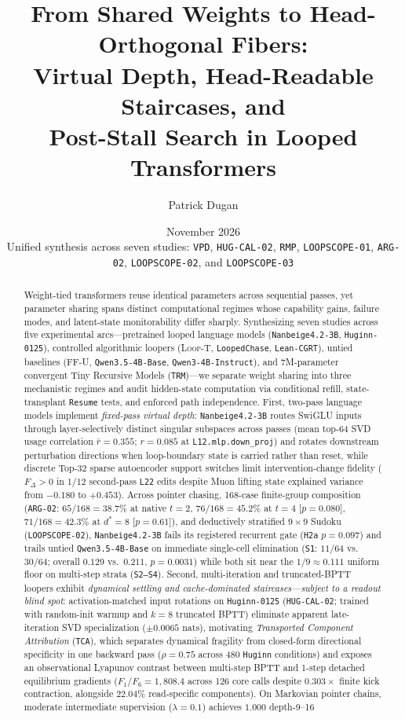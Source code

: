 \documentclass[10pt,letterpaper]{article}
\title{\bfseries From Shared Weights to Head-Orthogonal Fibers:\\[0.30em]
Virtual Depth, Head-Readable Staircases, and\\[0.14em]
Post-Stall Search in Looped Transformers}
\author{Patrick Dugan}
\date{November 2026\\[0.2em]\normalsize Unified synthesis across seven studies: \texttt{VPD}, \texttt{HUG-CAL-02}, \texttt{RMP}, \texttt{LOOPSCOPE-01}, \texttt{ARG-02}, \texttt{LOOPSCOPE-02}, and \texttt{LOOPSCOPE-03}}
\newcommand{\LoopT}{\textsc{Loop-T}}
\newcommand{\FFU}{\textsc{FF-U}}
\begin{document}
\maketitle
\vspace{-0.70em}

\begin{abstract}
\noindent
Weight-tied transformers reuse identical parameters across sequential passes, yet parameter sharing spans distinct computational regimes whose capability gains, failure modes, and latent-state monitorability differ sharply. Synthesizing seven studies across five experimental arcs—pretrained looped language models (\texttt{Nanbeige4.2-3B}, \texttt{Huginn-0125}), controlled algorithmic loopers (\LoopT, \texttt{LoopedChase}, \texttt{Lean-CGRT}), untied baselines (\FFU, \texttt{Qwen3.5-4B-Base}, \texttt{Qwen3-4B-Instruct}), and 7M-parameter convergent Tiny Recursive Models (\texttt{TRM})—we separate weight sharing into three mechanistic regimes and audit hidden-state computation via conditional refill, state-transplant \texttt{Resume} tests, and enforced path independence. First, two-pass language models implement \emph{fixed-pass virtual depth}: \texttt{Nanbeige4.2-3B} routes SwiGLU inputs through layer-selectively distinct singular subspaces across passes (mean top-64 SVD usage correlation $\bar{r}=0.355$; $r=0.085$ at \texttt{L12.mlp.down\_proj}) and rotates downstream perturbation directions when loop-boundary state is carried rather than reset, while discrete Top-32 sparse autoencoder support switches limit intervention-change fidelity ($F_\Delta > 0$ in $1/12$ second-pass \texttt{L22} edits despite Muon lifting state explained variance from $-0.180$ to $+0.453$). Across pointer chasing, 168-case finite-group composition (\texttt{ARG-02}: $65/168 = 38.7\%$ at native $t=2$, $76/168 = 45.2\%$ at $t=4$ [$p=0.080$], $71/168 = 42.3\%$ at $d^*=8$ [$p=0.61$]), and deductively stratified $9\times 9$ Sudoku (\texttt{LOOPSCOPE-02}), \texttt{Nanbeige4.2-3B} fails its registered recurrent gate (\texttt{H2a} $p=0.097$) and trails untied \texttt{Qwen3.5-4B-Base} on immediate single-cell elimination (\texttt{S1}: $11/64$ vs.\ $30/64$; overall $0.129$ vs.\ $0.211$, $p=0.0031$) while both sit near the $1/9 \approx 0.111$ uniform floor on multi-step strata (\texttt{S2--S4}). Second, multi-iteration and truncated-BPTT loopers exhibit \emph{dynamical settling and cache-dominated staircases—subject to a readout blind spot}: activation-matched input rotations on \texttt{Huginn-0125} (\texttt{HUG-CAL-02}; trained with random-init warmup and $k=8$ truncated BPTT) eliminate apparent late-iteration SVD specialization ($\pm 0.0065$ nats), motivating \emph{Transported Component Attribution} (\texttt{TCA}), which separates dynamical fragility from closed-form directional specificity in one backward pass ($\rho=0.75$ across 480 \texttt{Huginn} conditions) and exposes an observational Lyapunov contrast between multi-step BPTT and 1-step detached equilibrium gradients ($F_1/F_6 = 1{,}808.4$ across 126 core calls despite $0.303\times$ finite kick contraction, alongside $22.04\%$ read-specific components). On Markovian pointer chains, moderate intermediate supervision ($\lambda=0.1$) achieves $1.000$ depth-9--16 
\end{abstract}
\end{document}
